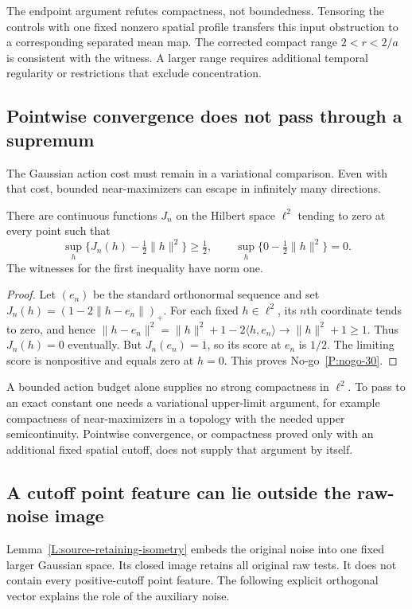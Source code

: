 The endpoint argument refutes compactness, not boundedness. Tensoring the
controls with one fixed nonzero spatial profile transfers this input
obstruction to a corresponding separated mean map. The corrected compact
range $2<r<2/a$ is consistent with the witness. A larger range requires
additional temporal regularity or restrictions that exclude concentration.

\subsection{Pointwise convergence does not pass through a supremum}
\label{S:nogo-30}

The Gaussian action cost must remain in a variational comparison. Even with
that cost, bounded near-maximizers can escape in infinitely many directions.

\setcounter{nogo}{29}
\begin{nogo}
  \label{P:nogo-30}
  There are continuous functions $J_n$ on the Hilbert space $\ell^2$ tending
  to zero at every point such that
  \[
    \sup_h\{J_n(h)-\tfrac12\|h\|^2\}\ge\tfrac12,
    \qquad
    \sup_h\{0-\tfrac12\|h\|^2\}=0.
  \]
  The witnesses for the first inequality have norm one.
\end{nogo}
\begin{proof}
  Let $(e_n)$ be the standard orthonormal sequence and set
  $J_n(h)=(1-2\|h-e_n\|)_+$.
  For each fixed $h\in\ell^2$, its $n$th coordinate tends to zero, and hence
  $\|h-e_n\|^2=\|h\|^2+1-2\langle h,e_n\rangle\to\|h\|^2+1\ge1$.
  Thus $J_n(h)=0$ eventually. But $J_n(e_n)=1$, so its score at $e_n$ is
  $1/2$. The limiting score is nonpositive and equals zero at $h=0$.
  This proves No-go~\ref{P:nogo-30}.
\end{proof}

A bounded action budget alone supplies no strong compactness in $\ell^2$.
To pass to an exact constant one needs a variational upper-limit argument,
for example compactness of near-maximizers in a topology with the needed
upper semicontinuity. Pointwise convergence, or compactness proved only with
an additional fixed spatial cutoff, does not supply that argument by itself.

\subsection{A cutoff point feature can lie outside the raw-noise image}
\label{S:nogo-32}

Lemma~\ref{L:source-retaining-isometry} embeds the original noise into one
fixed larger Gaussian space. Its closed image retains all original raw tests.
It does not contain every positive-cutoff point feature. The following
explicit orthogonal vector explains the role of the auxiliary noise.

